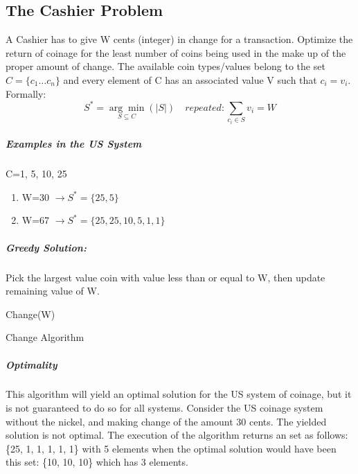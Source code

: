 \documentclass[12pt,letterpaper]{article}
\begin{document}
\subsection{The Cashier Problem}
A Cashier has to give W cents (integer) in change for a transaction. Optimize the return of coinage for the least number of coins being used in the make up of the proper amount of change. The available coin types/values belong to the set $C=\{c_1\dots c_n\}$ and every element of C has an associated value V such that $ c_i=v_i$. Formally:
\[ S^*= \underset{S\subseteq C}{\arg\min}(|S|)\quad repeated:\sum_{c_i\in S}v_i=W \]
\subparagraph{Examples in the US System}C={1, 5, 10, 25}
\begin{enumerate}
\item W=30 $\to S^*=\{25,5\}$
\item W=67 $\to S^*=\{25, 25, 10, 5, 1, 1\}$
\end{enumerate}
\subparagraph{Greedy Solution:} 
Pick the largest value coin with value less than or equal to W, then update remaining value of W.
\begin{algorithm}[h]
Change(W)
\caption{Change Algorithm}
\label{Change Algorithm}
\end{algorithm}
\subparagraph{Optimality}
This algorithm will yield an optimal solution for the US system of coinage, but it is not guaranteed to do so for all systems. Consider the US coinage system without the nickel, and making change of the amount 30 cents. The yielded solution is not optimal. The execution of the algorithm returns an set as follows: \{25, 1, 1, 1, 1, 1\} with 5 elements when the optimal solution would have been this set: \{10, 10, 10\} which has 3 elements.
\end{document}
